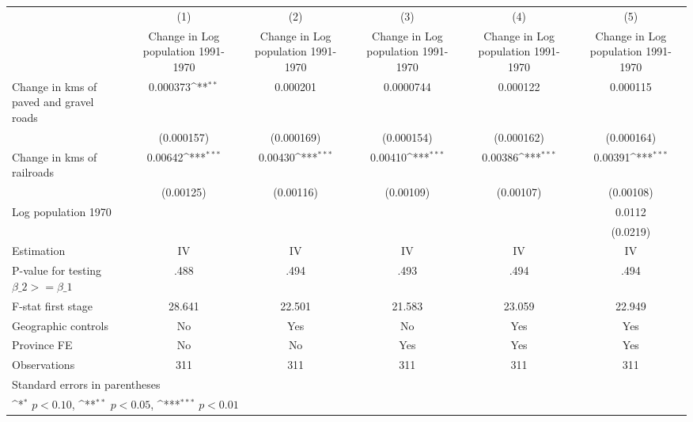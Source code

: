 {
\def\sym#1{\ifmmode^{#1}\else\(^{#1}\)\fi}
\begin{tabular}{l*{5}{c}}
\hline\hline
                    &\multicolumn{1}{c}{(1)}&\multicolumn{1}{c}{(2)}&\multicolumn{1}{c}{(3)}&\multicolumn{1}{c}{(4)}&\multicolumn{1}{c}{(5)}\\
                    &\multicolumn{1}{c}{Change in Log population 1991-1970}&\multicolumn{1}{c}{Change in Log population 1991-1970}&\multicolumn{1}{c}{Change in Log population 1991-1970}&\multicolumn{1}{c}{Change in Log population 1991-1970}&\multicolumn{1}{c}{Change in Log population 1991-1970}\\
\hline
Change in kms of paved and gravel roads&    0.000373\sym{**} &    0.000201         &   0.0000744         &    0.000122         &    0.000115         \\
                    &  (0.000157)         &  (0.000169)         &  (0.000154)         &  (0.000162)         &  (0.000164)         \\
[1em]
Change in kms of railroads&     0.00642\sym{***}&     0.00430\sym{***}&     0.00410\sym{***}&     0.00386\sym{***}&     0.00391\sym{***}\\
                    &   (0.00125)         &   (0.00116)         &   (0.00109)         &   (0.00107)         &   (0.00108)         \\
[1em]
Log population 1970 &                     &                     &                     &                     &      0.0112         \\
                    &                     &                     &                     &                     &    (0.0219)         \\
\hline
Estimation          &          IV         &          IV         &          IV         &          IV         &          IV         \\
P-value for testing $\beta\_2 >= \beta\_1$&        .488         &        .494         &        .493         &        .494         &        .494         \\
F-stat first stage  &      28.641         &      22.501         &      21.583         &      23.059         &      22.949         \\
Geographic controls &          No         &         Yes         &          No         &         Yes         &         Yes         \\
Province FE         &          No         &          No         &         Yes         &         Yes         &         Yes         \\
Observations        &         311         &         311         &         311         &         311         &         311         \\
\hline\hline
\multicolumn{6}{l}{\footnotesize Standard errors in parentheses}\\
\multicolumn{6}{l}{\footnotesize \sym{*} \(p<0.10\), \sym{**} \(p<0.05\), \sym{***} \(p<0.01\)}\\
\end{tabular}
}

